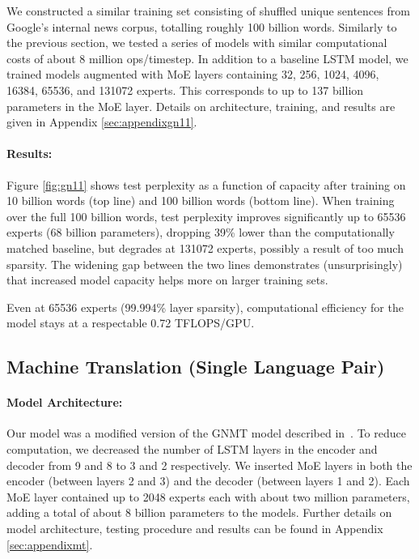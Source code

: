 \documentclass{article} %
\begin{document}
We constructed a similar training set consisting of shuffled unique sentences from Google's internal news corpus, totalling roughly 100 billion words.  Similarly to the previous section, we tested a series of models with similar computational costs of about 8 million ops/timestep.  In addition to a baseline LSTM model, we trained models augmented with MoE layers containing 32, 256, 1024, 4096, 16384, 65536, and 131072 experts.  This corresponds to up to 137 billion parameters in the MoE layer.  Details on architecture, training, and results are given in Appendix \ref{sec:appendixgn11}. 

\paragraph{Results:} Figure \ref{fig:gn11} shows test perplexity as a function of capacity after training on 10 billion words (top line) and 100 billion words (bottom line).  When training over the full 100 billion words, test perplexity improves significantly up to 65536 experts (68 billion parameters), dropping 39\% lower than the computationally matched baseline, but degrades at 131072 experts, possibly a result of too much sparsity.  The widening gap between the two lines demonstrates (unsurprisingly) that increased model capacity helps more on larger training sets.

Even at 65536 experts (99.994\% layer sparsity), computational efficiency for the model stays at a respectable 0.72 TFLOPS/GPU.




\subsection{Machine Translation (Single Language Pair)}
\label{sec:mt}
\paragraph{Model Architecture:} Our model was a modified version of the GNMT model described in~\citep{GNMT}.  To reduce computation, we decreased the number of LSTM layers in the encoder and decoder from 9 and 8 to 3 and 2 respectively.  We inserted MoE layers in both the encoder (between layers 2 and 3) and the decoder (between layers 1 and 2).  Each MoE layer contained up to 2048 experts each with about two million parameters, adding a total of about 8 billion parameters to the models.  Further details on model architecture, testing procedure and results can be found in Appendix \ref{sec:appendixmt}.
\end{document}
